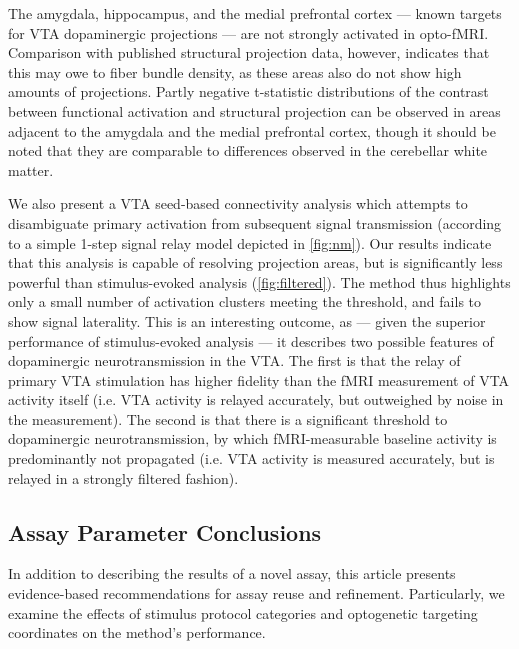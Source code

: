 The amygdala, hippocampus, and the medial prefrontal cortex --- known targets for VTA dopaminergic projections --- are not strongly activated in opto-fMRI.
Comparison with published structural projection data, however, indicates that this may owe to fiber bundle density, as these areas also do not show high amounts of projections.
Partly negative t-statistic distributions of the contrast between functional activation and structural projection can be observed in areas adjacent to the amygdala and the medial prefrontal cortex, though it should be noted that they are comparable to differences observed in the cerebellar white matter.

We also present a VTA seed-based connectivity analysis which attempts to disambiguate primary activation from subsequent signal transmission (according to a simple 1-step signal relay model depicted in \cref{fig:nm}).
Our results indicate that this analysis is capable of resolving projection areas, but is significantly less powerful than stimulus-evoked analysis (\cref{fig:filtered}).
The method thus highlights only a small number of activation clusters meeting the threshold, and fails to show signal laterality.
This is an interesting outcome, as --- given the superior performance of stimulus-evoked analysis --- it describes two possible features of dopaminergic neurotransmission in the VTA.
The first is that the relay of primary VTA stimulation has higher fidelity than the fMRI measurement of VTA activity itself (i.e. VTA activity is relayed accurately, but outweighed by noise in the measurement).
The second is that there is a significant threshold to dopaminergic neurotransmission, by which fMRI-measurable baseline activity is predominantly not propagated (i.e. VTA activity is measured accurately, but is relayed in a strongly filtered fashion).

\subsection{Assay Parameter Conclusions}

In addition to describing the results of a novel assay, this article presents evidence-based recommendations for assay reuse and refinement.
Particularly, we examine the effects of stimulus protocol categories and optogenetic targeting coordinates on the method's performance.

